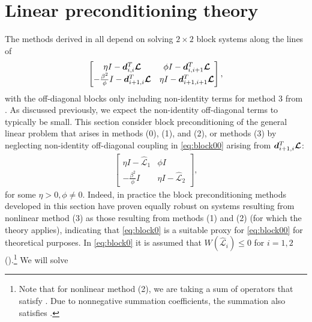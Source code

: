 \documentclass[review]{siamart}
\begin{document}
\section{Linear preconditioning theory}\label{sec:theory}

The methods derived in  all depend on
solving $2\times 2$ block systems along the lines of
%
\begin{align}\label{eq:block00}
\begin{bmatrix} \eta I - \bm{d}_{i,i}^T \bm{{\cal L}} & \phi I - \bm{d}_{i,i+1}^T \bm{{\cal L}}\\
-\frac{\beta^2}{\phi} I - \bm{d}_{i+1,i}^T \bm{{\cal L}} & \eta I -  \bm{d}_{i+1,i+1}^T \bm{{\cal L}}\end{bmatrix},
\end{align}
%
with the off-diagonal blocks only including non-identity terms for
method 3 from . As discussed previously,
we expect the non-identity off-diagonal terms to typically be small. This
section consider block preconditioning of the general linear problem
that arises in methods (0), (1), and (2), or methods (3) by neglecting
non-identity off-diagonal coupling in \eqref{eq:block00} arising from
$\bm{d}_{i+1,i}^T \bm{{\cal L}}$:
%
\begin{align}\label{eq:block0}
\begin{bmatrix} \eta I - \widehat{\mathcal{L}}_1 & \phi I\\
-\frac{\beta^2}{\phi} I & \eta I - \widehat{\mathcal{L}}_2\end{bmatrix},
\end{align}
%
for some $\eta > 0, \phi \neq 0$. Indeed, in
practice the block preconditioning methods developed in this section have
proven equally robust on systems resulting from nonlinear method (3)
as those resulting from methods (1) and (2) (for which the theory applies),
indicating that \eqref{eq:block0} is a suitable proxy for \eqref{eq:block00} for
theoretical purposes. In \eqref{eq:block0} it is assumed that
$W(\widehat{\mathcal{L}}_i) \leq 0$ for $i=1,2$ ().\footnote{
Note that for nonlinear method (2), we are taking a sum of operators that
satisfy . Due to nonnegative summation coefficients, the
summation also satisfies .} We will solve
\end{document}
